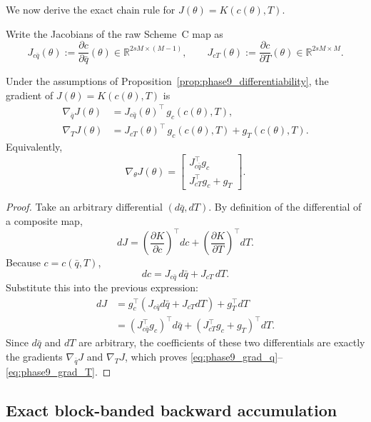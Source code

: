 We now derive the exact chain rule for \(J(\theta)=K(c(\theta),T)\).

Write the Jacobians of the raw Scheme~C map as
\[
J_{c\bar q}(\theta)
:=
\frac{\partial c}{\partial \bar q}(\theta)
\in\mathbb R^{2sM\times(M-1)},
\qquad
J_{cT}(\theta)
:=
\frac{\partial c}{\partial T}(\theta)
\in\mathbb R^{2sM\times M}.
\]

\begin{theorem}
\label{thm:phase9_chain_rule}
Under the assumptions of Proposition~\ref{prop:phase9_differentiability},
the gradient of \(J(\theta)=K(c(\theta),T)\) is
\begin{align}
\label{eq:phase9_grad_q}
\nabla_{\bar q}J(\theta)
&=
J_{c\bar q}(\theta)^\top\, g_c(c(\theta),T),\\
\label{eq:phase9_grad_T}
\nabla_{T}J(\theta)
&=
J_{cT}(\theta)^\top\, g_c(c(\theta),T)
+
g_T(c(\theta),T).
\end{align}
Equivalently,
\begin{equation}
\label{eq:phase9_full_grad}
\nabla_\theta J(\theta)
=
\begin{bmatrix}
J_{c\bar q}^\top g_c\\
J_{cT}^\top g_c+g_T
\end{bmatrix}.
\end{equation}
\end{theorem}

\begin{proof}
Take an arbitrary differential \((d\bar q,dT)\).
By definition of the differential of a composite map,
\[
dJ
=
\left(\frac{\partial K}{\partial c}\right)^\top dc
+
\left(\frac{\partial K}{\partial T}\right)^\top dT.
\]
Because \(c=c(\bar q,T)\),
\[
dc
=
J_{c\bar q}\,d\bar q
+
J_{cT}\,dT.
\]
Substitute this into the previous expression:
\begin{align*}
dJ
&=
g_c^\top(J_{c\bar q}d\bar q + J_{cT}dT)
+
g_T^\top dT\\
&=
(J_{c\bar q}^\top g_c)^\top d\bar q
+
(J_{cT}^\top g_c + g_T)^\top dT.
\end{align*}
Since \(d\bar q\) and \(dT\) are arbitrary, the coefficients of these two differentials are exactly the gradients \(\nabla_{\bar q}J\) and \(\nabla_T J\), which proves \eqref{eq:phase9_grad_q}--\eqref{eq:phase9_grad_T}.
\end{proof}

\subsection{Exact block-banded backward accumulation}
\label{subsec:phase9_banded_accumulation}

